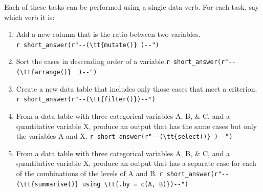 \documentclass[
  letterpaper,
  DIV=11,
  numbers=noendperiod,
  oneside]{scrartcl}
\providecommand{\tightlist}{%
  \setlength{\itemsep}{0pt}\setlength{\parskip}{0pt}}\usepackage{longtable,booktabs,array}
\begin{document}
\begin{tcolorbox}[enhanced jigsaw, colbacktitle=quarto-callout-note-color!10!white, opacityback=0, breakable, opacitybacktitle=0.6, colback=white, coltitle=black, arc=.35mm, title=\textcolor{quarto-callout-note-color}{\faInfo}\hspace{0.5em}{Exercise 5.37 snail-sing-knife}, left=2mm, colframe=quarto-callout-note-color-frame, rightrule=.15mm, bottomrule=.15mm, leftrule=.75mm, bottomtitle=1mm, toptitle=1mm, titlerule=0mm, toprule=.15mm]

Each of these tasks can be performed using a single data verb. For each
task, say which verb it is:

\begin{enumerate}
\def\labelenumi{\arabic{enumi}.}
\tightlist
\item
  Add a new column that is the ratio between two variables.
  \texttt{r\ short\_answer(r"-\/-(\textbackslash{}tt\{mutate()\}\ )-\/-")}
\item
  Sort the cases in descending order of a
  variable.\texttt{r\ short\_answer(r"-\/-(\textbackslash{}tt\{arrange()\}\ \ )-\/-")}
\item
  Create a new data table that includes only those cases that meet a
  criterion.
  \texttt{r\ short\_answer(r"-\/-(\textbackslash{}tt\{filter()\})-\/-")}
\item
  From a data table with three categorical variables A, B, \& C, and a
  quantitative variable X, produce an output that has the same cases but
  only the variables A and X.
  \texttt{r\ short\_answer(r"-\/-(\textbackslash{}tt\{select()\}\ )-\/-")}
\item
  From a data table with three categorical variables A, B, \& C, and a
  quantitative variable X, produce an output that has a separate case
  for each of the combinations of the levels of A and B.
  \texttt{r\ short\_answer(r"-\/-(\textbackslash{}tt\{summarise()\}\ using\ \textbackslash{}tt\{.by\ =\ c(A,\ B)\})-\/-")}
\end{enumerate}

\end{tcolorbox}
\end{document}
